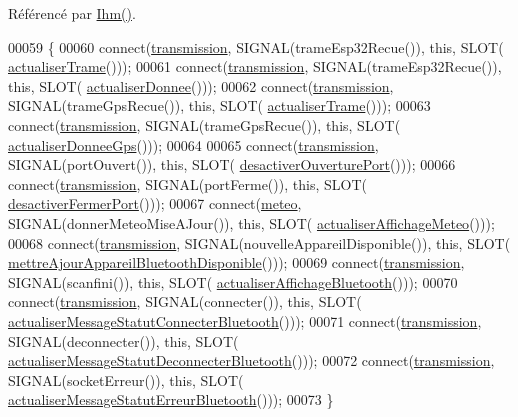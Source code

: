 Référencé par \hyperlink{class_ihm_a50a7a15775452923868348bdbe4fa51e}{Ihm()}.


\begin{DoxyCode}
00059 \{
00060     connect(\hyperlink{class_ihm_aa8fa25758a4f3e47e07d1d98f6bbab33}{transmission}, SIGNAL(trameEsp32Recue()), \textcolor{keyword}{this}, SLOT(
      \hyperlink{class_ihm_a94ea90d27fc0aa7598cf270dd3be98eb}{actualiserTrame}()));
00061     connect(\hyperlink{class_ihm_aa8fa25758a4f3e47e07d1d98f6bbab33}{transmission}, SIGNAL(trameEsp32Recue()), \textcolor{keyword}{this}, SLOT(
      \hyperlink{class_ihm_a7c0a160f30e11a4f8d56b174e07566fe}{actualiserDonnee}()));
00062     connect(\hyperlink{class_ihm_aa8fa25758a4f3e47e07d1d98f6bbab33}{transmission}, SIGNAL(trameGpsRecue()), \textcolor{keyword}{this}, SLOT(
      \hyperlink{class_ihm_a94ea90d27fc0aa7598cf270dd3be98eb}{actualiserTrame}()));
00063     connect(\hyperlink{class_ihm_aa8fa25758a4f3e47e07d1d98f6bbab33}{transmission}, SIGNAL(trameGpsRecue()), \textcolor{keyword}{this}, SLOT(
      \hyperlink{class_ihm_a3ca276093d65c42a5fc5a87cbca1972a}{actualiserDonneeGps}()));
00064 
00065     connect(\hyperlink{class_ihm_aa8fa25758a4f3e47e07d1d98f6bbab33}{transmission}, SIGNAL(portOuvert()), \textcolor{keyword}{this}, SLOT(
      \hyperlink{class_ihm_ab0a18639faa9f2c0b2a141321be4b973}{desactiverOuverturePort}()));
00066     connect(\hyperlink{class_ihm_aa8fa25758a4f3e47e07d1d98f6bbab33}{transmission}, SIGNAL(portFerme()), \textcolor{keyword}{this}, SLOT(
      \hyperlink{class_ihm_a6a9bb865ffa3baf686ce16f11f69c57f}{desactiverFermerPort}()));
00067     connect(\hyperlink{class_ihm_af17b420166b2bb1b3e3b1c4b998a2102}{meteo}, SIGNAL(donnerMeteoMiseAJour()), \textcolor{keyword}{this}, SLOT(
      \hyperlink{class_ihm_a65487c8229375ff72290bed145876737}{actualiserAffichageMeteo}()));
00068     connect(\hyperlink{class_ihm_aa8fa25758a4f3e47e07d1d98f6bbab33}{transmission}, SIGNAL(nouvelleAppareilDisponible()), \textcolor{keyword}{this}, SLOT(
      \hyperlink{class_ihm_a9d9ac22e5d73a010bc75a1fcf2e7ddcb}{mettreAjourAppareilBluetoothDisponible}()));
00069     connect(\hyperlink{class_ihm_aa8fa25758a4f3e47e07d1d98f6bbab33}{transmission}, SIGNAL(scanfini()), \textcolor{keyword}{this}, SLOT(
      \hyperlink{class_ihm_a02118154be39cdd3de7fdbdbe396a534}{actualiserAffichageBluetooth}()));
00070     connect(\hyperlink{class_ihm_aa8fa25758a4f3e47e07d1d98f6bbab33}{transmission}, SIGNAL(connecter()), \textcolor{keyword}{this}, SLOT(
      \hyperlink{class_ihm_a5d7e6bdacfedc0f0dc4d7b3516454788}{actualiserMessageStatutConnecterBluetooth}()));
00071     connect(\hyperlink{class_ihm_aa8fa25758a4f3e47e07d1d98f6bbab33}{transmission}, SIGNAL(deconnecter()), \textcolor{keyword}{this}, SLOT(
      \hyperlink{class_ihm_ad73cc62bafa9c43288f69fbac2b80508}{actualiserMessageStatutDeconnecterBluetooth}()));
00072     connect(\hyperlink{class_ihm_aa8fa25758a4f3e47e07d1d98f6bbab33}{transmission}, SIGNAL(socketErreur()), \textcolor{keyword}{this}, SLOT(
      \hyperlink{class_ihm_a29b4c5fba871a30f7f2e5fbe08a2087d}{actualiserMessageStatutErreurBluetooth}()));
00073 \}
\end{DoxyCode}
